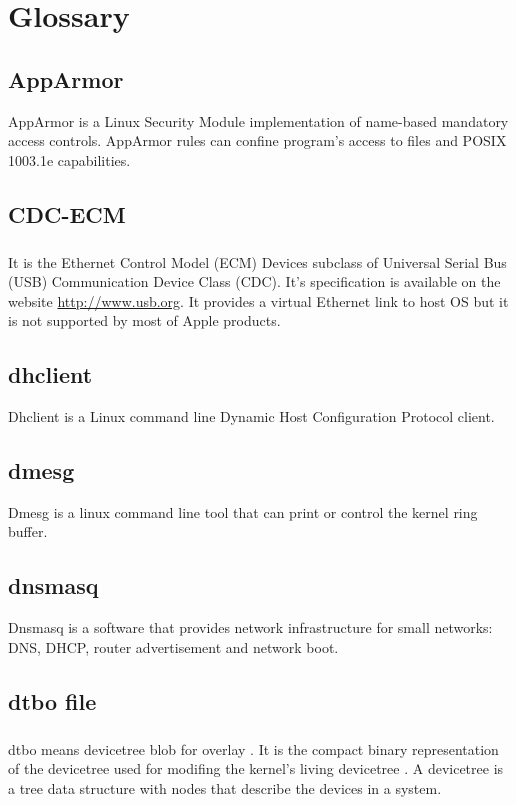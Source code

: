 \documentclass[mscthesis]{usiinfthesis}
\begin{document}
\backmatter

\chapter{Glossary} %
\section{AppArmor}\label{sec:AppArmor}
AppArmor is a Linux Security Module implementation of name-based mandatory access controls. AppArmor rules can confine program's access to files and POSIX 1003.1e capabilities.

\section{CDC-ECM}\label{sec:CDC-ECM}
\paragraph{}
It is the Ethernet Control Model (ECM) Devices subclass of Universal Serial Bus (USB) Communication Device Class (CDC). It's specification is available on the website \url{http://www.usb.org}. It provides a virtual Ethernet link to host OS but it is not supported by most of Apple products.

\section{dhclient}\label{sec:dhclient}
Dhclient is a Linux command line Dynamic Host Configuration Protocol client.

\section{dmesg}\label{sec:dmesg}
Dmesg is a linux command line tool that can print or control the kernel ring buffer.

\section{dnsmasq}\label{sec:dnsmasq}
Dnsmasq is a software that provides network infrastructure for small networks: DNS, DHCP, router advertisement and network boot.

\section{dtbo file}\label{sec:dtbo}
\paragraph{}
dtbo means devicetree blob for overlay \citep{dtbo:android}. It is the compact binary representation of the devicetree used for modifing the kernel's living devicetree \citep{dtbo:kernel}. A devicetree is a tree data structure with nodes that describe the devices in a system. \citep{dtbo:spec}
\end{document}
